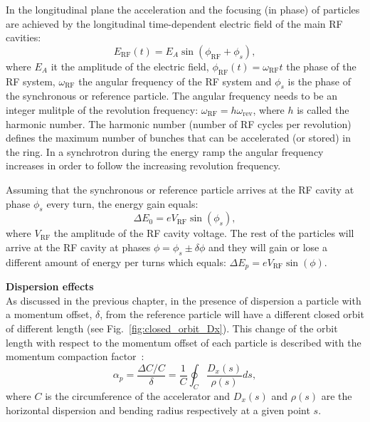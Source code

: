 In the longitudinal plane the acceleration and the focusing (in phase) of particles are achieved by the longitudinal time-dependent electric field of the main RF cavities:
\begin{equation}\label{eq:RF_cavity_EF}
    E_\mathrm{{RF}}(t) = E_A \sin{(\phi_\mathrm{{RF}} + \phi_s)},
\end{equation}
where $E_A$ it the amplitude of the electric field, $\phi_\mathrm{{RF}}(t) = \omega_\mathrm{{RF}}t$ the phase of the RF system, $\omega_\mathrm{{RF}}$ the angular frequency of the RF system and $\phi_s$ is the phase of the synchronous or reference particle. The angular frequency needs to be an integer mulitple of the revolution frequency: $ \omega_\mathrm{RF} = h \omega_\mathrm{rev}$, where $h$ is called the harmonic number. The harmonic number (number of RF cycles per revolution) defines the maximum number of bunches that can be accelerated (or stored) in the ring. %
In a synchrotron during the energy ramp the angular frequency increases in order to follow the increasing revolution frequency.

Assuming that the synchronous or reference particle arrives at the RF cavity at phase $\phi_s$ every turn, the energy gain equals:
\begin{equation}\label{eq:enerhy_gain_synchronous}
    \Delta E_0 = e V_\mathrm{RF} \sin{(\phi_s)}, 
\end{equation}
where $V_\mathrm{RF}$ the amplitude of the RF cavity voltage. The rest of the particles will arrive at the RF cavity at phases $\phi = \phi_s \pm \delta \phi$ and they will gain or lose a different amount of energy per turns which equals: $\Delta E_p = e V_\mathrm{RF} \sin{(\phi)}$. 
 
\textbf{Dispersion effects}\\
As discussed in the previous chapter, in the presence of dispersion a particle with a momentum offset, $\delta$, from the reference particle will have a different closed orbit of different length (see Fig.~\ref{fig:closed_orbit_Dx}). This change of the orbit length with respect to the momentum offset of each particle is described with the momentum compaction factor~\cite{emetral_juas_2018}: %
\begin{equation}\label{eq:compaction_factor}
    \alpha_p = \frac{\Delta C /C}{\delta} = \frac{1}{C} \oint _C \frac{D_x(s)}{\rho(s)} ds,
\end{equation} %
where $C$ is the circumference of the accelerator and $D_x(s)$ and $\rho(s)$ are the horizontal dispersion and bending radius respectively at a given point $s$.

